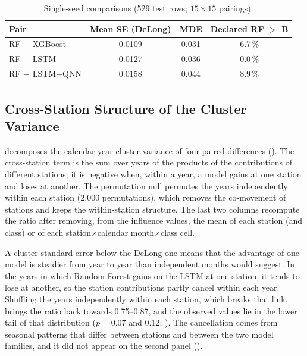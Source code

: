 \documentclass[11pt,a4paper]{article}
\begin{document}
\begin{table}[htbp]
\centering
\caption{Single-seed comparisons (529 test rows; $15\times15$ pairings).}
\label{tab:single_seed}
{\small
\begin{tabular}{lccc}
\toprule
\textbf{Pair} & \textbf{Mean SE (DeLong)} & \textbf{MDE} & \textbf{Declared RF $>$ B} \\
\midrule
RF $-$ XGBoost & 0.0109 & 0.031 & 6.7\,\% \\
RF $-$ LSTM & 0.0127 & 0.036 & 0.0\,\% \\
RF $-$ LSTM+QNN & 0.0158 & 0.044 & 8.9\,\% \\
\bottomrule
\end{tabular}}
\end{table}

\subsection{Cross-Station Structure of the Cluster Variance}
\label{app:cancellation}

 decomposes the calendar-year cluster variance of four paired differences (). The cross-station term is the sum over years of the products of the contributions of different stations; it is negative when, within a year, a model gains at one station and loses at another. The permutation null permutes the years independently within each station (2{,}000 permutations), which removes the co-movement of stations and keeps the within-station structure. The last two columns recompute the ratio after removing, from the influence values, the mean of each station (and class) or of each station$\times$calendar month$\times$class cell.

A cluster standard error below the DeLong one means that the advantage of one model is steadier from year to year than independent months would suggest. In the years in which Random Forest gains on the LSTM at one station, it tends to lose at another, so the station contributions partly cancel within each year. Shuffling the years independently within each station, which breaks that link, brings the ratio back towards 0.75--0.87, and the observed values lie in the lower tail of that distribution ($p=0.07$ and 0.12; ). The cancellation comes from seasonal patterns that differ between stations and between the two model families, and it did not appear on the second panel ().
\end{document}
